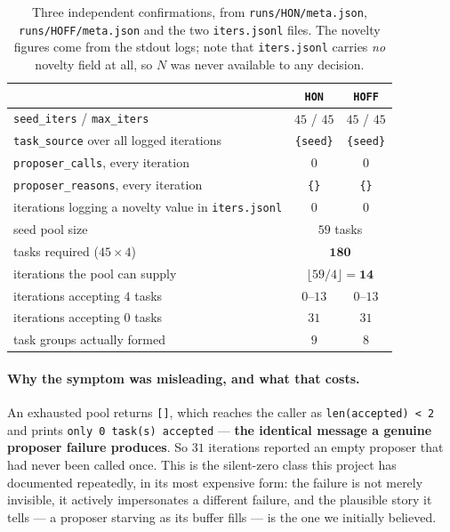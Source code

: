 \begin{table}[t]
\centering\small
\caption{Three independent confirmations, from \texttt{runs/HON/meta.json},
\texttt{runs/HOFF/meta.json} and the two \texttt{iters.jsonl} files. The novelty figures come
from the stdout logs; note that \texttt{iters.jsonl} carries \emph{no} novelty field at all, so
$N$ was never available to any decision.}
\label{tab:seedpool}
\begin{tabular}{lcc}
\toprule
& \texttt{HON} & \texttt{HOFF} \\
\midrule
\texttt{seed\_iters} / \texttt{max\_iters} & $45$ / $45$ & $45$ / $45$ \\
\texttt{task\_source} over all logged iterations & \texttt{\{seed\}} & \texttt{\{seed\}} \\
\texttt{proposer\_calls}, every iteration & $0$ & $0$ \\
\texttt{proposer\_reasons}, every iteration & \texttt{\{\}} & \texttt{\{\}} \\
iterations logging a novelty value in \texttt{iters.jsonl} & $0$ & $0$ \\
\midrule
seed pool size & \multicolumn{2}{c}{$59$ tasks} \\
tasks required ($45 \times 4$) & \multicolumn{2}{c}{$\mathbf{180}$} \\
iterations the pool can supply & \multicolumn{2}{c}{$\lfloor 59/4 \rfloor = \mathbf{14}$} \\
\midrule
iterations accepting $4$ tasks & $0$--$13$ & $0$--$13$ \\
iterations accepting $0$ tasks & $31$ & $31$ \\
task groups actually formed & $9$ & $8$ \\
\bottomrule
\end{tabular}
\end{table}

\paragraph{Why the symptom was misleading, and what that costs.} An exhausted pool returns
\texttt{[]}, which reaches the caller as \texttt{len(accepted) < 2} and prints \texttt{only 0
task(s) accepted} --- \textbf{the identical message a genuine proposer failure produces}. So
$31$ iterations reported an empty proposer that had never been called once. This is the
silent-zero class this project has documented repeatedly, in its most expensive form: the
failure is not merely invisible, it actively impersonates a different failure, and the
plausible story it tells --- a proposer starving as its buffer fills --- is the one we
initially believed.


